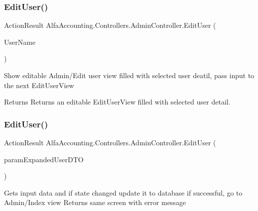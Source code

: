\subsubsection{\texorpdfstring{Edit\+User()}{EditUser()}\hspace{0.1cm}{\footnotesize\ttfamily [1/2]}}
{\footnotesize\ttfamily Action\+Result Alfa\+Accounting.\+Controllers.\+Admin\+Controller.\+Edit\+User (\begin{DoxyParamCaption}\item[{string}]{User\+Name }\end{DoxyParamCaption})}



Show editable Admin/\+Edit user view filled with selected user deatil, pass input to the next Edit\+User\+View 

\begin{DoxyReturn}{Returns}
Returns an editable Edit\+User\+View filled with selected user detail.
\end{DoxyReturn}
\mbox{\label{class_alfa_accounting_1_1_controllers_1_1_admin_controller_a4b86dd20b249b83effa34719bb32bcf3}} 
\subsubsection{\texorpdfstring{Edit\+User()}{EditUser()}\hspace{0.1cm}{\footnotesize\ttfamily [2/2]}}
{\footnotesize\ttfamily Action\+Result Alfa\+Accounting.\+Controllers.\+Admin\+Controller.\+Edit\+User (\begin{DoxyParamCaption}\item[{Expanded\+User\+D\+TO}]{param\+Expanded\+User\+D\+TO }\end{DoxyParamCaption})}



Gets input data and if state changed update it to database if successful, go to Admin/\+Index view Returns same screen with error message 


